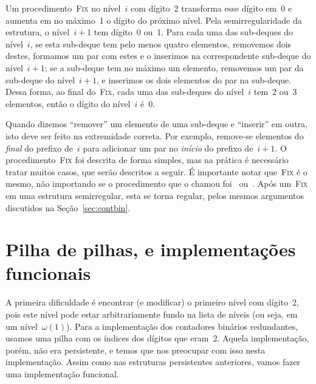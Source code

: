 \documentclass[main.tex]{subfiles}
\begin{document}
Um procedimento~\textsc{Fix} no nível~$i$ com dígito~2 transforma esse dígito em~0 e aumenta em no máximo~1 o dígito do próximo nível. Pela semirregularidade da estrutura, o nível~$i+1$ tem dígito~0 ou~1. Para cada uma das sub-deques do nível~$i$, se esta sub-deque tem pelo menos quatro elementos, removemos dois destes, formamos um par com estes e o inserimos na correspondente sub-deque do nível~$i+1$; se a sub-deque tem no máximo um elemento, removemos um par da sub-deque do nível~$i+1$, e inserimos os dois elementos do par na sub-deque. Dessa forma, ao final do~\textsc{Fix}, cada uma das sub-deques do nível~$i$ tem~2 ou~3 elementos, então o dígito do nível~$i$ é~0.

Quando dizemos ``remover'' um elemento de uma sub-deque e ``inserir'' em outra, isto deve ser feito na extremidade correta. Por exemplo, remove-se elementos do \emph{final} do prefixo de~$i$ para adicionar um par no \emph{início} do prefixo de~$i+1$. O procedimento~\textsc{Fix} foi descrita de forma simples, mas na prática é necessário tratar muitos casos, que serão descritos a seguir. É importante notar que~\textsc{Fix} é o mesmo, não importando se o procedimento que o chamou foi~ ou~. Após um~\textsc{Fix} em uma estrutura semirregular, esta se torna regular, pelos mesmos argumentos discutidos na Seção~\ref{sec:contbin}.

\section{Pilha de pilhas, e implementações funcionais} \label{sec:implfunc}

A primeira dificuldade é encontrar (e modificar) o primeiro nível com dígito~2, pois este nível pode estar arbitrariamente fundo na lista de níveis (ou seja, em um nível~$\omega(1)$). Para a implementação dos contadores binários redundantes, usamos uma pilha com os índices dos dígitos que eram~2. Aquela implementação, porém, não era persistente, e temos que nos preocupar com isso nesta implementação. Assim como nas estruturas persistentes anteriores, vamos fazer uma implementação funcional.

\end{document}
